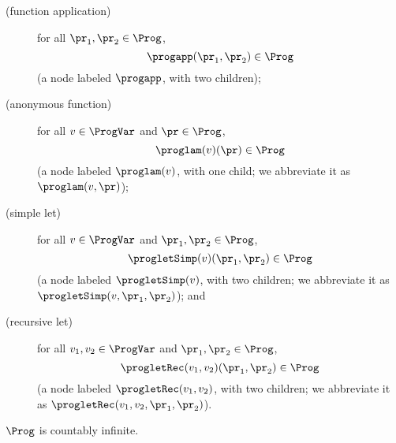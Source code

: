 \begin{description}
\item[\quad(function application)] for all $\pr_1,\pr_2\in\Prog$,
  \begin{displaymath}
    \progapp(\pr_1, \pr_2)\in\Prog    
  \end{displaymath}
(a node labeled $\progapp$, with two children);

\item[\quad(anonymous function)] for all $v\in\ProgVar$ and
  $\pr\in\Prog$,
  \begin{displaymath}
    \proglam(v)(\pr)\in\Prog    
  \end{displaymath}
  (a node labeled $\proglam(v)$, with one child; we abbreviate it as
  $\proglam(v,\pr)$);

\item[\quad(simple let)] for all $v\in\ProgVar$ and
  $\pr_1,\pr_2\in\Prog$,
  \begin{displaymath}
    \progletSimp(v)(\pr_1,\pr_2)\in\Prog  
  \end{displaymath}
  (a node labeled $\progletSimp(v)$, with two children; we abbreviate
  it as $\progletSimp(v, \pr_1, \pr_2)$); and

\item[\quad(recursive let)] for all $v_1,v_2\in\ProgVar$ and
  $\pr_1,\pr_2\in\Prog$,
  \begin{displaymath}
    \progletRec(v_1,v_2)(\pr_1,\pr_2)\in\Prog
  \end{displaymath}
  (a node labeled $\progletRec(v_1,v_2)$, with two children; we
  abbreviate it as $\progletRec(v_1,v_2,\pr_1,\pr_2)$).
\end{description}
$\Prog$ is countably infinite.

